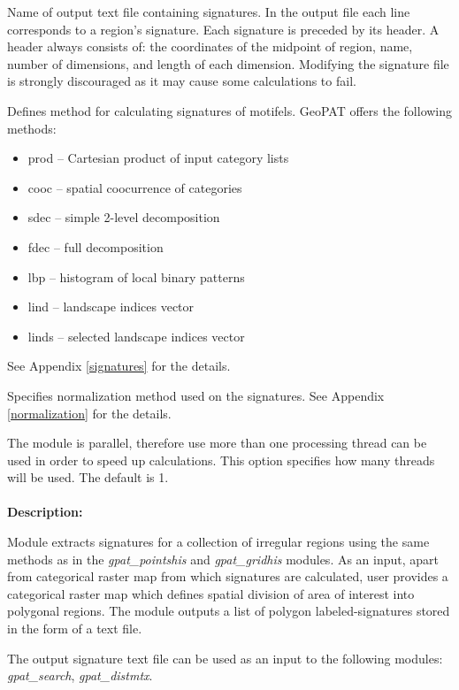 
Name of output text file containing signatures. 
In the output file each line corresponds to a region's signature.
Each signature is preceded by its header. 
A header always consists of: the coordinates of the midpoint of region, name, number of dimensions, and length of each dimension. 
Modifying the signature file is strongly discouraged as it may cause some calculations to fail.


Defines method for calculating signatures of motifels. 
GeoPAT offers the following methods: 
\begin{itemize}
	\item prod -- Cartesian product of input category lists
	\item cooc -- spatial coocurrence of categories
	\item sdec -- simple 2-level decomposition
	\item fdec -- full decomposition
	\item lbp -- histogram of local binary patterns
	\item lind -- landscape indices vector
	\item linds -- selected landscape indices vector
\end{itemize}
See Appendix \ref{signatures} for the details.


Specifies normalization method used on the signatures. 
See Appendix \ref{normalization} for the details.


The module is parallel, therefore use more than one processing thread can be used in order to speed up calculations. 
This option specifies how many threads will be used. 
The default is 1.
\\\\
{\bf Description:}

Module extracts signatures for a collection of irregular regions using the same methods as in the {\it gpat\_pointshis} and {\it gpat\_gridhis} modules. 
As an input, apart from categorical raster map from which signatures are calculated, user provides a categorical raster map which defines spatial division of area of interest into polygonal regions. 
The module outputs a list of polygon labeled-signatures stored in the form of a text file. 

The output signature text file can be used as an input to the following modules: {\it gpat\_search}, {\it gpat\_distmtx}.

